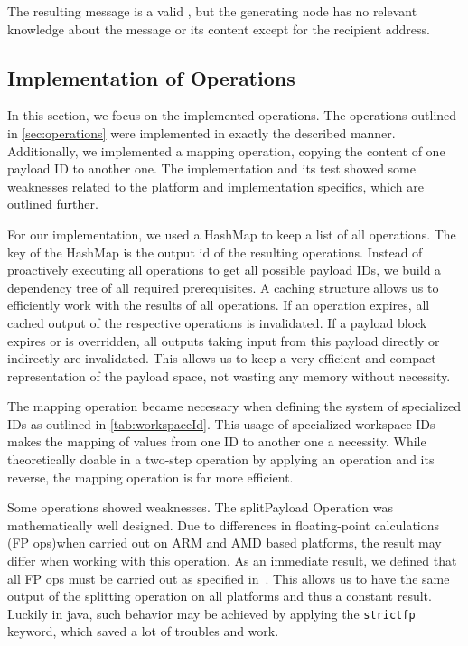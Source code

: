 The resulting message is a valid \VortexMessage, but the generating node has no relevant knowledge about the message or its content except for the recipient address.

\subsection{Implementation of Operations\label{sec:implOperations}}
In this section, we focus on the implemented operations. The operations outlined in \cref{sec:operations} were implemented in exactly the described manner. Additionally, we implemented a mapping operation, copying the content of one payload ID to another one. The implementation and its test showed some weaknesses related to the platform and implementation specifics, which are outlined further.

For our implementation, we used a HashMap to keep a list of all operations. The key of the HashMap is the output id of the resulting operations. Instead of proactively executing all operations to get all possible payload IDs, we build a dependency tree of all required prerequisites. A caching structure allows us to efficiently work with the results of all operations. If an operation expires, all cached output of the respective operations is invalidated. If a payload block expires or is overridden, all outputs taking input from this payload directly or indirectly are invalidated. This allows us to keep a very efficient and compact representation of the payload space, not wasting any memory without necessity.

The mapping operation became necessary when defining the system of specialized IDs as outlined in \cref{tab:workspaceId}. This usage of specialized workspace IDs makes the mapping of values from one  ID to another one a necessity. While theoretically doable in a two-step operation by applying an operation and its reverse, the mapping operation is far more efficient.

Some operations showed weaknesses. The splitPayload Operation was mathematically well designed. Due to differences in floating-point calculations (FP ops)when carried out on ARM and AMD based platforms, the result may differ when working with this operation. As an immediate result, we defined that all FP ops must be carried out as specified in~\cite{IEEE754}. This allows us to have the same output of the splitting operation on all platforms and thus a constant result. Luckily in java, such behavior may be achieved by applying the \lstinline[columns=fixed,basicstyle={\normalsize}]{strictfp} keyword, which saved a lot of troubles and work.

